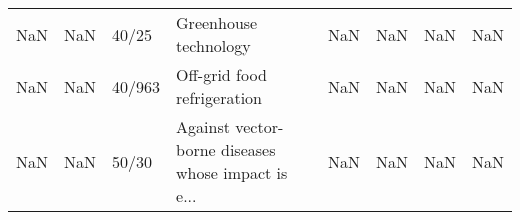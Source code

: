 \begin{tabular}{llllllll}
               NaN &                                                NaN &                          40/25 &                              Greenhouse technology &               NaN &                                                NaN &              NaN &                                                NaN \\
               NaN &                                                NaN &                         40/963 &                        Off-grid food refrigeration &               NaN &                                                NaN &              NaN &                                                NaN \\
               NaN &                                                NaN &                          50/30 & Against vector-borne diseases whose impact is e... &               NaN &                                                NaN &              NaN &                                                NaN \\
\bottomrule
\end{tabular}
